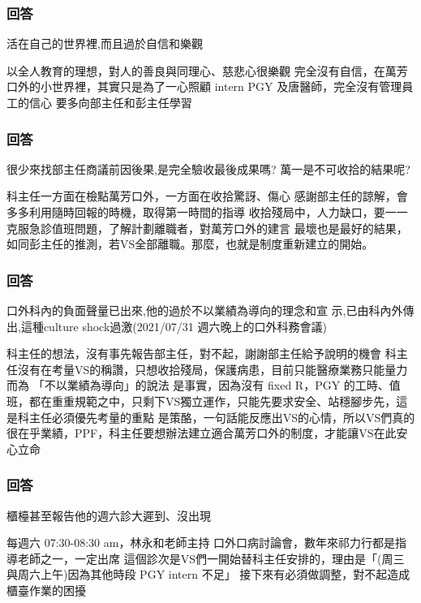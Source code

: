 \documentclass[t,24pt,aspectratio=169]{beamer}
\begin{document}



\begin{frame}[hoved]
\frametitle{回答}
活在自己的世界裡,而且過於自信和樂觀

\begin{outline}
\1 以全人教育的理想，對人的善良與同理心、慈悲心很樂觀
\1 完全沒有自信，在萬芳口外的小世界裡，其實只是為了一心照顧 intern PGY 及唐醫師，完全沒有管理員工的信心
\1 要多向部主任和彭主任學習
\end{outline}

\end{frame}

\begin{frame}[hoved]
\frametitle{回答}
很少來找部主任商議前因後果,是完全驗收最後成果嗎?
萬一是不可收拾的結果呢?
\begin{outline}
\1 科主任一方面在檢點萬芳口外，一方面在收拾驚訝、傷心
\1 感謝部主任的諒解，會多多利用隨時回報的時機，取得第一時間的指導
\1 收拾殘局中，人力缺口，要一一克服急診值班問題，了解計劃離職者，對萬芳口外的建言
\1 最壞也是最好的結果，如同彭主任的推測，若VS全部離職。那麼，也就是制度重新建立的開始。
\end{outline}

\end{frame}

\begin{frame}[hoved]
\frametitle{回答}
口外科內的負面聲量已出來,他的過於不以業績為導向的理念和宣
示,已由科內外傳出,這種culture shock過激(2021/07/31 週六晚上的口外科務會議) 
\begin{outline}
\1 科主任的想法，沒有事先報告部主任，對不起，謝謝部主任給予說明的機會
\1 科主任沒有在考量VS的稱讚，只想收拾殘局，保護病患，目前只能醫療業務只能量力而為
\1 「不以業績為導向」的說法
    \2 是事實，因為沒有 fixed R，PGY 的工時、值班，都在重重規範之中，只剩下VS獨立運作，只能先要求安全、站穩腳步先，這是科主任必須優先考量的重點
    \2 是策酪，一句話能反應出VS的心情，所以VS們真的很在乎業績，PPF，科主任要想辦法建立適合萬芳口外的制度，才能讓VS在此安心立命

\end{outline}

\end{frame}

\begin{frame}[hoved]
\frametitle{回答}
櫃檯甚至報告他的週六診大遲到、沒出現
\begin{outline}
\1 每週六 07:30-08:30 am，林永和老師主持 口外口病討論會，數年來祁力行都是指導老師之一，一定出席
    \2 這個診次是VS們一開始替科主任安排的，理由是「(周三與周六上午)因為其他時段 PGY intern 不足」
    \2 接下來有必須做調整，對不起造成櫃臺作業的困擾

\end{outline}


\end{frame}
\end{document}
